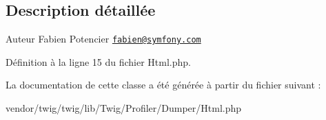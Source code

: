 \subsection{Description détaillée}
\begin{DoxyAuthor}{Auteur}
Fabien Potencier \href{mailto:fabien@symfony.com}{\tt fabien@symfony.\+com} 
\end{DoxyAuthor}


Définition à la ligne 15 du fichier Html.\+php.



La documentation de cette classe a été générée à partir du fichier suivant \+:\begin{DoxyCompactItemize}
\item 
vendor/twig/twig/lib/\+Twig/\+Profiler/\+Dumper/Html.\+php\end{DoxyCompactItemize}
